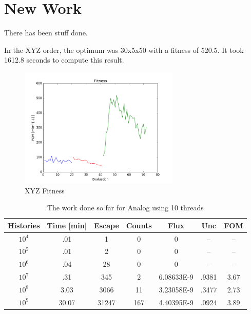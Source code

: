 \documentclass{article}
\begin{document}
\section{New Work}
There has been stuff done.

In the XYZ order, the optimum was 30x5x50 with a fitness of 520.5. It took 1612.8 seconds to compute this result.

\begin{figure}
    \centering
    \includegraphics[width=3.0in]{fitness_xyz}
    \caption{XYZ Fitness}
    \label{fig:fitness_xyz}
\end{figure}

\begin{table}
\begin{center}
\label{tbl_decay}
\caption{The work done so far for Analog using 10 threads}
\begin{tabular}{|c|c|c|c|c|c|c|}
\hline
\textbf{Histories} & \textbf{Time [min]} & \textbf{Escape} & \textbf{Counts} & \textbf{Flux} & \textbf{Unc} & \textbf{FOM} \\ \hline
$10^4$ & .01 & 1 & 0 & 0 & -- & -- \\ \hline
$10^5$ & .01 & 2 & 0 & 0 & -- & -- \\ \hline
$10^6$ & .04 & 28 & 0 & 0 & -- & -- \\ \hline
$10^7$ & .31 & 345 & 2 & 6.08633E-9 & .9381 & 3.67 \\ \hline
$10^8$ & 3.03 & 3066 & 11 & 3.23058E-9 & .3477 & 2.73 \\ \hline
$10^9$ & 30.07 & 31247 & 167 & 4.40395E-9 & .0924 & 3.89 \\ \hline
\end{tabular}
\end{center}
\end{table}
\end{document}
